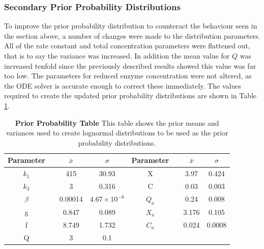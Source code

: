 
\subsubsection{Secondary Prior Probability Distributions}
To improve the prior probability distribution to counteract the behaviour seen in the section above, a number of changes were made to the distribution parameters. All of the rate constant and total concentration parameters were flattened out, that is to say the variance was increased. In addition the mean value for $Q$ was increased tenfold since the previously described results showed this value was far too low. The parameters for reduced enzyme concentration were not altered, as the ODE solver is accurate enough to correct these immediately. The values required to create the updated prior probability distributions are shown in Table \ref{tab:oxyProbstat1}.
\begin{table}[h]%
\renewcommand{\arraystretch}{1.5}
\begin{center}
\begin{tabular}{cccc|cccc}
\toprule
\textbf{Parameter} && ${\bar{x}}$ & $\sigma$ & \textbf{Parameter} && ${\bar{x}}$ & $\sigma$\\
\midrule
$k_1$ && 415 & 30.93 & X && 3.97 & 0.424\\
$k_3$ && 3 & 0.316 & C && 0.03 & 0.003\\
$\beta$ && 0.00014 & $4.67\times 10^{-6}$ & $Q_a$ && 0.24 & 0.008\\
g && 0.847 & 0.089 & $X_a$ && 3.176 & 0.105\\
f && 8.749 & 1.732 & $C_a$ && 0.024 & 0.0008\\
Q && 3 & 0.1\\
\bottomrule
\end{tabular}
\end{center}
\caption[Second Prior Probability Table]{{\bf Prior Probability Table} This table shows the prior means and variances used to create lognormal distributions to be used as the prior probability distributions.
\label{tab:oxyProbstat1}}
\end{table}
\afterpage{\clearpage}

